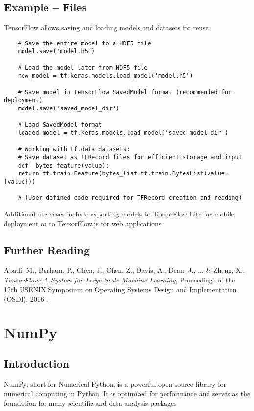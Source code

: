 \subsection{Example -- Files}
TensorFlow allows saving and loading models and datasets for reuse:

\begin{verbatim}
	# Save the entire model to a HDF5 file
	model.save('model.h5')
	
	# Load the model later from HDF5 file
	new_model = tf.keras.models.load_model('model.h5')
	
	# Save model in TensorFlow SavedModel format (recommended for deployment)
	model.save('saved_model_dir')
	
	# Load SavedModel format
	loaded_model = tf.keras.models.load_model('saved_model_dir')
	
	# Working with tf.data datasets:
	# Save dataset as TFRecord files for efficient storage and input
	def _bytes_feature(value):
	return tf.train.Feature(bytes_list=tf.train.BytesList(value=[value]))
	
	# (User-defined code required for TFRecord creation and reading)
\end{verbatim}

Additional use cases include exporting models to TensorFlow Lite for mobile deployment or to TensorFlow.js for web applications.

\subsection{Further Reading}
Abadi, M., Barham, P., Chen, J., Chen, Z., Davis, A., Dean, J., ... \& Zheng, X., \textit{TensorFlow: A System for Large-Scale Machine Learning}, Proceedings of the 12th USENIX Symposium on Operating Systems Design and Implementation (OSDI), 2016 \cite{abadi2016tensorflow}.


\section{NumPy}

\subsection{Introduction}
NumPy, short for Numerical Python, is a powerful open-source library for numerical computing in Python. It is optimized for performance and serves as the foundation for many scientific and data analysis packages \cite{harris2020array}


